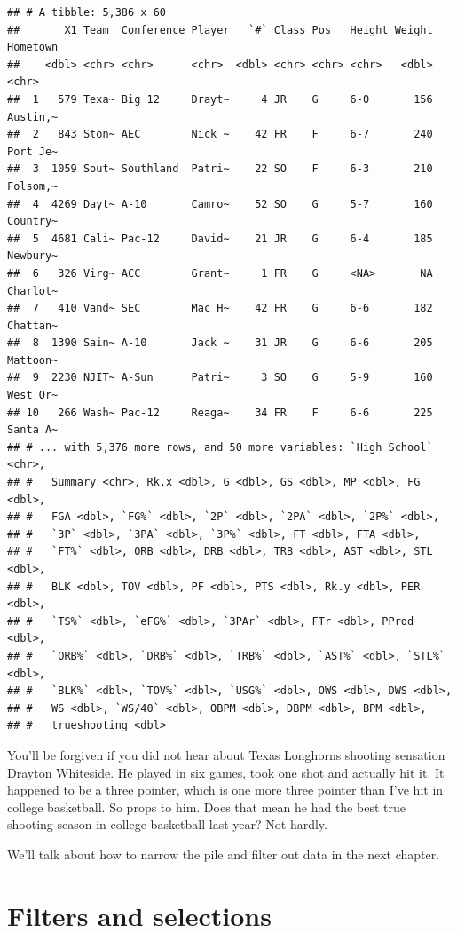 \documentclass[]{book}
\begin{document}
\begin{verbatim}
## # A tibble: 5,386 x 60
##       X1 Team  Conference Player   `#` Class Pos   Height Weight Hometown
##    <dbl> <chr> <chr>      <chr>  <dbl> <chr> <chr> <chr>   <dbl> <chr>   
##  1   579 Texa~ Big 12     Drayt~     4 JR    G     6-0       156 Austin,~
##  2   843 Ston~ AEC        Nick ~    42 FR    F     6-7       240 Port Je~
##  3  1059 Sout~ Southland  Patri~    22 SO    F     6-3       210 Folsom,~
##  4  4269 Dayt~ A-10       Camro~    52 SO    G     5-7       160 Country~
##  5  4681 Cali~ Pac-12     David~    21 JR    G     6-4       185 Newbury~
##  6   326 Virg~ ACC        Grant~     1 FR    G     <NA>       NA Charlot~
##  7   410 Vand~ SEC        Mac H~    42 FR    G     6-6       182 Chattan~
##  8  1390 Sain~ A-10       Jack ~    31 JR    G     6-6       205 Mattoon~
##  9  2230 NJIT~ A-Sun      Patri~     3 SO    G     5-9       160 West Or~
## 10   266 Wash~ Pac-12     Reaga~    34 FR    F     6-6       225 Santa A~
## # ... with 5,376 more rows, and 50 more variables: `High School` <chr>,
## #   Summary <chr>, Rk.x <dbl>, G <dbl>, GS <dbl>, MP <dbl>, FG <dbl>,
## #   FGA <dbl>, `FG%` <dbl>, `2P` <dbl>, `2PA` <dbl>, `2P%` <dbl>,
## #   `3P` <dbl>, `3PA` <dbl>, `3P%` <dbl>, FT <dbl>, FTA <dbl>,
## #   `FT%` <dbl>, ORB <dbl>, DRB <dbl>, TRB <dbl>, AST <dbl>, STL <dbl>,
## #   BLK <dbl>, TOV <dbl>, PF <dbl>, PTS <dbl>, Rk.y <dbl>, PER <dbl>,
## #   `TS%` <dbl>, `eFG%` <dbl>, `3PAr` <dbl>, FTr <dbl>, PProd <dbl>,
## #   `ORB%` <dbl>, `DRB%` <dbl>, `TRB%` <dbl>, `AST%` <dbl>, `STL%` <dbl>,
## #   `BLK%` <dbl>, `TOV%` <dbl>, `USG%` <dbl>, OWS <dbl>, DWS <dbl>,
## #   WS <dbl>, `WS/40` <dbl>, OBPM <dbl>, DBPM <dbl>, BPM <dbl>,
## #   trueshooting <dbl>
\end{verbatim}

You'll be forgiven if you did not hear about Texas Longhorns shooting
sensation Drayton Whiteside. He played in six games, took one shot and
actually hit it. It happened to be a three pointer, which is one more
three pointer than I've hit in college basketball. So props to him. Does
that mean he had the best true shooting season in college basketball
last year? Not hardly.

We'll talk about how to narrow the pile and filter out data in the next
chapter.

\chapter{Filters and selections}\label{filters-and-selections}
\end{document}
